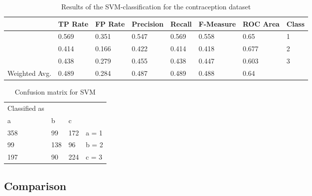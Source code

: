 \documentclass[paper=a4, fontsize=11pt]{scrartcl} %
\numberwithin{equation}{section} %
\numberwithin{figure}{section} %
\numberwithin{table}{section} %
\begin{document}
\begin{table}[h]
\centering
\begin{tabular}{|llllllll|}
	\hline
	&								TP Rate   	&FP Rate   &Precision   &Recall  &F-Measure   &ROC Area  	&Class\\
	\hline
									&0.569     	&0.351     &0.547     	&0.569   &0.558      	&0.65     	&1\\
                 	&0.414     	&0.166     &0.422     	&0.414   &0.418      	&0.677    	&2\\
                 	&0.438     	&0.279     &0.455     	&0.438   &0.447      	&0.603    	&3\\
  \hline
	Weighted Avg.   &0.489     	&0.284     &0.487     	&0.489   &0.488      	&0.64			&\\
	\hline
\end{tabular}
\caption{Results of the SVM-classification for the contraception dataset}
\end{table}

\vspace{6pt}

\begin{table}[h]
\centering
\begin{tabular}{|llll|}
	\hline
	Classified as	& & &\\
	a		&	b & c& \\
	\hline
	358	& 99 	&172 &   a = 1\\
  99 	&	138 &96  &   b = 2\\
 	197 & 90 	&224 &   c = 3\\
  \hline
\end{tabular}
\caption{Confusion matrix for SVM}
\end{table}

\subsection{Comparison}


\end{document}

